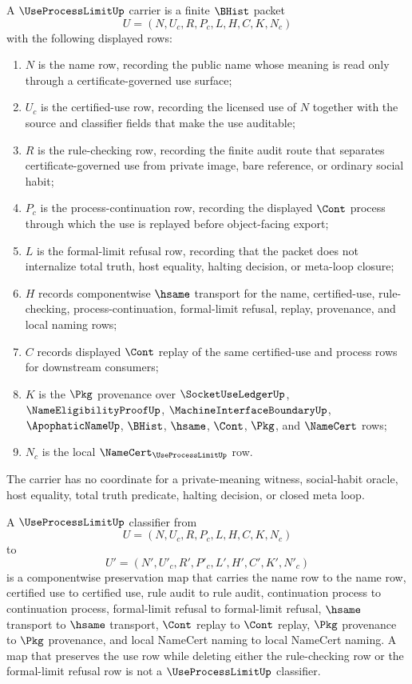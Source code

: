 \begin{definition}
\label{def:use-process-limit-carrier}
A $\UseProcessLimitUp$ carrier is a finite $\BHist$ packet
$$
U=(N,U_c,R,P_c,L,H,C,K,N_c)
$$
with the following displayed rows:
\begin{enumerate}
\item $N$ is the name row, recording the public name whose meaning is read only through a certificate-governed use surface;
\item $U_c$ is the certified-use row, recording the licensed use of $N$ together with the source and classifier fields that make the use auditable;
\item $R$ is the rule-checking row, recording the finite audit route that separates certificate-governed use from private image, bare reference, or ordinary social habit;
\item $P_c$ is the process-continuation row, recording the displayed $\Cont$ process through which the use is replayed before object-facing export;
\item $L$ is the formal-limit refusal row, recording that the packet does not internalize total truth, host equality, halting decision, or meta-loop closure;
\item $H$ records componentwise $\hsame$ transport for the name, certified-use, rule-checking, process-continuation, formal-limit refusal, replay, provenance, and local naming rows;
\item $C$ records displayed $\Cont$ replay of the same certified-use and process rows for downstream consumers;
\item $K$ is the $\Pkg$ provenance over $\SocketUseLedgerUp$, $\NameEligibilityProofUp$, $\MachineInterfaceBoundaryUp$, $\ApophaticNameUp$, $\BHist$, $\hsame$, $\Cont$, $\Pkg$, and $\NameCert$ rows;
\item $N_c$ is the local $\NameCert_{\UseProcessLimitUp}$ row.
\end{enumerate}
The carrier has no coordinate for a private-meaning witness, social-habit oracle, host equality, total truth predicate, halting decision, or closed meta loop.
\end{definition}

\begin{definition}
\label{def:use-process-limit-classifier}
A $\UseProcessLimitUp$ classifier from
$$
U=(N,U_c,R,P_c,L,H,C,K,N_c)
$$
to
$$
U'=(N',U'_c,R',P'_c,L',H',C',K',N'_c)
$$
is a componentwise preservation map that carries the name row to the name row, certified use to certified use, rule audit to rule audit, continuation process to continuation process, formal-limit refusal to formal-limit refusal, $\hsame$ transport to $\hsame$ transport, $\Cont$ replay to $\Cont$ replay, $\Pkg$ provenance to $\Pkg$ provenance, and local NameCert naming to local NameCert naming. A map that preserves the use row while deleting either the rule-checking row or the formal-limit refusal row is not a $\UseProcessLimitUp$ classifier.
\end{definition}

